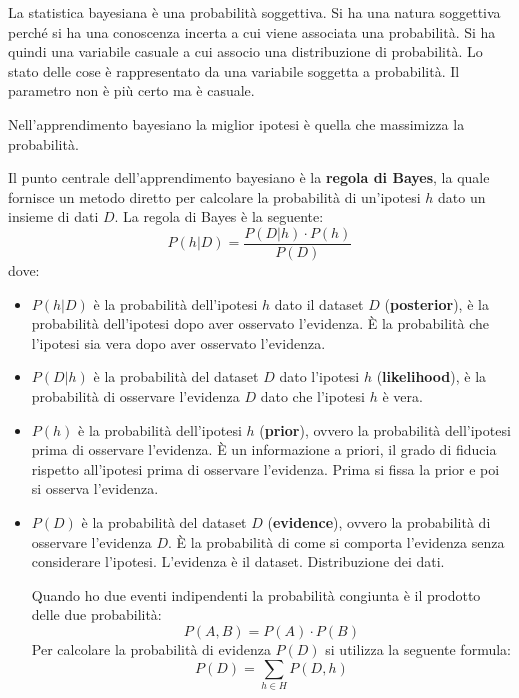 La statistica bayesiana è una probabilità soggettiva. Si ha una natura soggettiva perché si ha una conoscenza incerta a cui viene associata una probabilità. Si ha quindi una variabile casuale a cui associo una distribuzione di probabilità. Lo stato delle cose è rappresentato da una variabile soggetta a probabilità. Il parametro non è più certo ma è casuale.

Nell'apprendimento bayesiano la miglior ipotesi è quella che massimizza la probabilità.

Il punto centrale dell'apprendimento bayesiano è la \textbf{regola di Bayes}, la quale fornisce un metodo diretto per calcolare la probabilità di un'ipotesi $h$ dato un insieme di dati $D$. La regola di Bayes è la seguente:
\begin{equation}
    P(h|D) = \frac{P(D|h) \cdot P(h)}{P(D)}
\end{equation}
dove:
\begin{itemize}
    \item $P(h|D)$ è la probabilità dell'ipotesi $h$ dato il dataset $D$ (\textbf{posterior}), è la probabilità dell'ipotesi dopo aver osservato l'evidenza. È la probabilità che l'ipotesi sia vera dopo aver osservato l'evidenza.
    \item $P(D|h)$ è la probabilità del dataset $D$ dato l'ipotesi $h$ (\textbf{likelihood}), è la probabilità di osservare l'evidenza $D$ dato che l'ipotesi $h$ è vera.
    \item $P(h)$ è la probabilità dell'ipotesi $h$ (\textbf{prior}), ovvero la probabilità dell'ipotesi prima di osservare l'evidenza. È un informazione a priori, il grado di fiducia rispetto all'ipotesi prima di osservare l'evidenza. Prima si fissa la prior e poi si osserva l'evidenza.
    \item $P(D)$ è la probabilità del dataset $D$ (\textbf{evidence}), ovvero la probabilità di osservare l'evidenza $D$. È la probabilità di come si comporta l'evidenza senza considerare l'ipotesi. L'evidenza è il dataset. Distribuzione dei dati.
    
    Quando ho due eventi indipendenti la probabilità congiunta è il prodotto delle due probabilità:
    \begin{equation}
        P(A, B) = P(A) \cdot P(B)
    \end{equation}
    Per calcolare la probabilità di evidenza $P(D)$ si utilizza la seguente formula:
    \begin{equation}
        P(D) = \sum_{h \in H} P(D, h)
    \end{equation}
\end{itemize}

